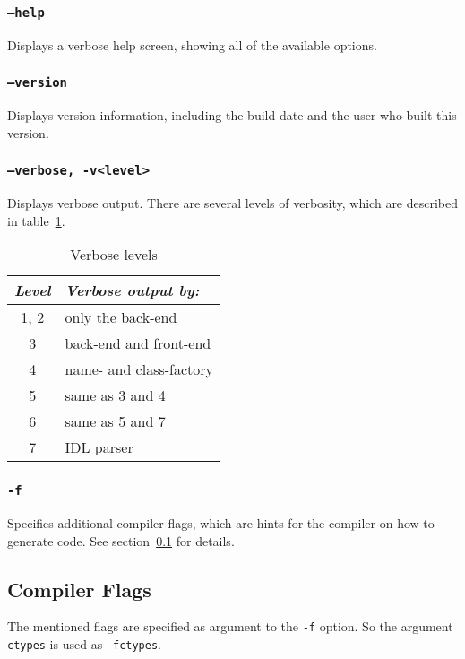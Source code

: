 \subsubsection{{\tt --help}}
Displays a verbose help screen, showing all of the available
options.

\subsubsection{{\tt --version}}
Displays version information, including the build date and the
user who built this version.

\subsubsection{{\tt --verbose, -v<level>}}
Displays verbose output. There are several levels of verbosity,
which are described in table~\ref{tab:verbose}.

\begin{table}[htb]
\begin{center}
\begin{tabular}{|c|l|} \hline
\it Level & \it Verbose output by: \\ \hline \hline
1, 2 & only the back-end \\ \hline
3 & back-end and front-end \\ \hline
4 & name- and class-factory \\ \hline
5 & same as 3 and 4 \\ \hline
6 & same as 5 and 7 \\ \hline
7 & IDL parser \\ \hline
\end{tabular}
\caption{\label{tab:verbose} Verbose levels}
\end{center}
\end{table}

\subsubsection{{\tt -f}}
Specifies additional compiler flags, which are hints for the compiler
on how to generate code. See section~\ref{sec:comp-flags} for details.

\subsection{Compiler Flags}
\label{sec:comp-flags}
The mentioned flags are specified as argument to the {\tt -f} option.
So the argument {\tt ctypes} is used as {\tt -fctypes}.

